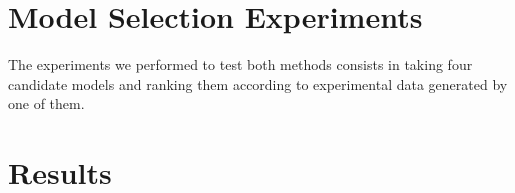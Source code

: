 \section{Model Selection Experiments}
The experiments we performed to test both methods consists in taking 
four candidate models and ranking them according to experimental data 
generated by one of them.

\section{Results}


